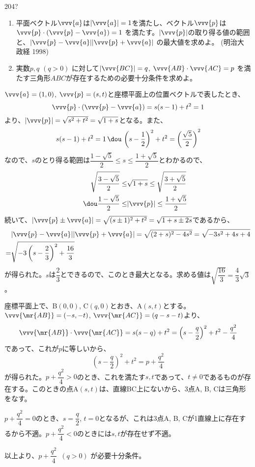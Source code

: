 \begin{thm}{204}{\hosi ?}{}
 \begin{enumerate}
  \item 平面ベクトル$\vvv{a}$は$|\vvv{a}|=1$を満たし、ベクトル$\vvv{p}$は$\vvv{p}\cdot(\vvv{p}-\vvv{a})=1$ を満たす。$|\vvv{p}|$の取り得る値の範囲と、$|\vvv{p}-\vvv{a}| |\vvv{p}+\vvv{a}|$ の最大値を求めよ。 (明治大 政経 1998)
  \item 実数$p, q$ $(q>0)$ に対して$|\vvv{BC}|=q$, $\vvv{AB}\cdot\vvv{AC}=p$ を満たす三角形$ABC$が存在するための必要十分条件を求めよ。
 \end{enumerate}
\end{thm}

$\vvv{a}=(1,0)$, $\vvv{p}=(s, t)$と座標平面上の位置ベクトルで表したとき、
\[ \vvv{p}\cdot(\vvv{p}-\vvv{a})=s(s-1)+t^2=1 \]
より、$|\vvv{p}|=\sqrt{s^2+t^2}=\sqrt{1+s}$となる。また、
\[ s(s-1)+t^2=1 \,\dou\, \left(s-\frac{1}{2}\right)^2+t^2=\left(\frac{\sqrt{5}}{2}\right)^2 \]
なので、$s$のとり得る範囲は$\dfrac{1-\sqrt{5}}{2}\le s\le \dfrac{1+\sqrt{5}}{2}$とわかるので、
\begin{align*}
 \sqrt{\frac{3-\sqrt{5}}{2}} \le &\sqrt{1+s} \le\sqrt{\frac{3+\sqrt{5}}{2}} \\
\qquad\dou \frac{1-\sqrt{5}}{2}\le &|\vvv{p}| \le \frac{1+\sqrt{5}}{2} 
\end{align*}
続いて、$|\vvv{p}\pm\vvv{a}|=\sqrt{(s\pm1)^2+t^2}=\sqrt{1+s\pm 2s}$であるから、
\begin{align*}
 &|\vvv{p}-\vvv{a}| |\vvv{p}+\vvv{a}| = \sqrt{(2+s)^2-4s^2} = \sqrt{-3s^2+4s+4} \\
 =& \sqrt{-3\left(s-\frac{2}{3}\right)^2+\frac{16}{3}}
\end{align*}
が得られた。$s$は$\dfrac{2}{3}$とできるので、このとき最大となる。求める値は$\sqrt{\dfrac{16}{3}}=\dfrac{4}{3}\sqrt{3}$。

座標平面上で、B$(0,0)$, C$(q,0)$とおき、A$(s, t)$とする。$\vvv{\mr{AB}}=(-s,-t)$, $\vvv{\mr{AC}}=(q-s -t)$より、
\[ \vvv{\mr{AB}}\cdot\vvv{\mr{AC}}=s(s-q)+t^2=\left(s-\frac{q}{2}\right)^2+t^2-\frac{q^2}{4} \]
であって、これが$p$に等しいから、
\[ \left(s-\frac{q}{2}\right)^2+t^2=p+\frac{q^2}{4} \]
が得られた。$p+\dfrac{q^2}{4}>0$のとき、これを満たす$s, t$であって、$t\neq 0$であるものが存在する。このときの点A$(s, t)$は、直線BC上にないから、3点A, B, Cは三角形をなす。

$p+\dfrac{q^2}{4}=0$のとき、$s=\dfrac{q}{2}$, $t=0$となるが、これは3点A, B, Cが1直線上に存在するから不適。$p+\dfrac{q^2}{4}<0$のときには$s, t$が存在せず不適。

以上より、$p+\dfrac{q^2}{4}$~$(q>0)$ が必要十分条件。
